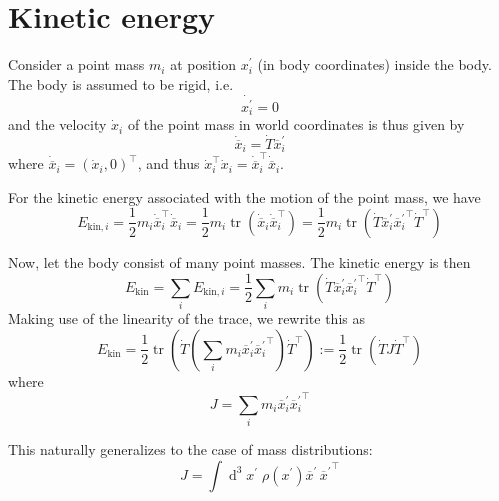 \documentclass[a4paper]{article}
\begin{document}
\section{Kinetic energy}
Consider a point mass $m_i$ at position $x^\prime_i$ (in body coordinates) inside the body. The body is assumed to be rigid, i.e.
\begin{equation}
\dot{x^\prime_i} = 0
\end{equation}
and the velocity $\dot{x}_i$ of the point mass in world coordinates is thus given by
\begin{equation}
\dot{\overline{x}}_i = \dot{T} \overline{x}^\prime_i
\end{equation}
where $\dot{\overline{x}}_i = (\dot{x}_i, 0)^\top$, and thus $\dot{x}_i^\top \dot{x}_i = \dot{\overline{x}}_i^\top \dot{\overline{x}}_i$.

For the kinetic energy associated with the motion of the point mass, we have
\begin{equation}
E_{\mathrm{kin},i} = \frac{1}{2} m_i \dot{\overline{x}}_i^\top \dot{\overline{x}}_i
= \frac{1}{2} m_i \operatorname{tr} (\dot{\overline{x}}_i \dot{\overline{x}}_i^\top )
= \frac{1}{2} m_i \operatorname{tr} (\dot{T} \overline{x}^\prime_i {\overline{x}^\prime_i}^\top \dot{T}^\top )
\end{equation}

Now, let the body consist of many point masses. The kinetic energy is then
\begin{equation}
E_\mathrm{kin} = \sum_i E_{\mathrm{kin},i}
= \frac{1}{2} \sum_i m_i \operatorname{tr} (\dot{T} \overline{x}^\prime_i {\overline{x}^\prime_i}^\top \dot{T}^\top )
\end{equation}
Making use of the linearity of the trace, we rewrite this as
\begin{equation}
\label{eqn:ekindef}
E_\mathrm{kin} = \frac{1}{2}\operatorname{tr} \left( \dot{T} \left(\sum_i m_i \overline{x}^\prime_i {\overline{x}_i^\prime}^\top \right) \dot{T}^\top \right)
:= \frac{1}{2} \operatorname{tr} (\dot{T} J \dot{T}^\top )
\end{equation}
where
\begin{equation}
J = \sum_i m_i \overline{x}_i^\prime {\overline{x}_i^\prime}^\top
\end{equation}

This naturally generalizes to the case of mass distributions:
\begin{equation}
J = \int \operatorname{d}^3\!x^\prime\; \rho(x^\prime) \overline{x}^\prime\,{\overline{x}^\prime}^\top
\end{equation}
\end{document}
